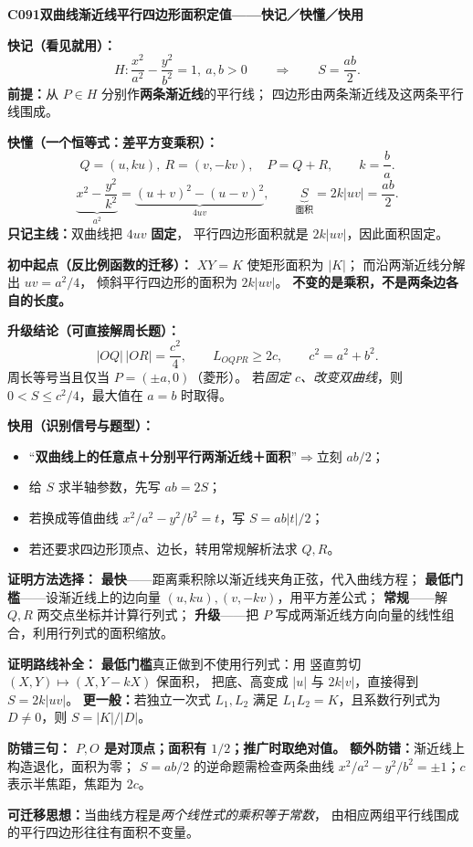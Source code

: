 \clearpage
\begin{summarybox}
\textbf{C091\quad 双曲线渐近线平行四边形面积定值——快记／快懂／快用}

\textbf{快记（看见就用）：}
\[
\boxed{H:\frac{x^2}{a^2}-\frac{y^2}{b^2}=1,\ a,b>0}
\qquad\Longrightarrow\qquad
\boxed{S=\frac{ab}{2}}.
\]
\textbf{前提：}从 $P\in H$ 分别作\textbf{两条渐近线}的平行线；
四边形由两条渐近线及这两条平行线围成。

\textbf{快懂（一个恒等式：差平方变乘积）：}
\[
Q=(u,ku),\ R=(v,-kv),\quad
P=Q+R,\qquad k=\frac ba.
\]
\[
\underbrace{x^2-\frac{y^2}{k^2}}_{a^2}
=\underbrace{(u+v)^2-(u-v)^2}_{4uv},\qquad
\underbrace{S}_{\text{面积}}=2k|uv|=\frac{ab}{2}.
\]
\textbf{只记主线：}双曲线把 $4uv$ \textbf{固定}，
平行四边形面积就是 $2k|uv|$，因此面积固定。

\textbf{初中起点（反比例函数的迁移）：}
$XY=K$ 使矩形面积为 $|K|$；
而沿两渐近线分解出 $uv=a^2/4$，
倾斜平行四边形的面积为 $2k|uv|$。
\textbf{不变的是乘积，不是两条边各自的长度。}

\textbf{升级结论（可直接解周长题）：}
\[
\boxed{|OQ|\,|OR|=\frac{c^2}{4}},\qquad
\boxed{L_{OQPR}\ge2c},\qquad c^2=a^2+b^2.
\]
周长等号当且仅当 $P=(\pm a,0)$（菱形）。
若\emph{固定 $c$、改变双曲线}，则
$\boxed{0<S\le c^2/4}$，最大值在 $a=b$ 时取得。



\textbf{快用（识别信号与题型）：}
\begin{itemize}
\item “\textbf{双曲线上的任意点＋分别平行两渐近线＋面积}”$\Rightarrow$立刻 $ab/2$；
\item 给 $S$ 求半轴参数，先写 $\boxed{ab=2S}$；
\item 若换成等值曲线 $x^2/a^2-y^2/b^2=t$，写 $\boxed{S=ab|t|/2}$；
\item 若还要求四边形顶点、边长，转用常规解析法求 $Q,R$。
\end{itemize}

\textbf{证明方法选择：}
\textbf{最快}——距离乘积除以渐近线夹角正弦，代入曲线方程；
\textbf{最低门槛}——设渐近线上的边向量 $(u,ku),(v,-kv)$，用平方差公式；
\textbf{常规}——解 $Q,R$ 两交点坐标并计算行列式；
\textbf{升级}——把 $P$ 写成两渐近线方向向量的线性组合，利用行列式的面积缩放。

\textbf{证明路线补全：}
\textbf{最低门槛}真正做到不使用行列式：用
竖直剪切 $(X,Y)\mapsto(X,Y-kX)$ 保面积，
把底、高变成 $|u|$ 与 $2k|v|$，直接得到 $S=2k|uv|$。
\textbf{更一般：}若独立一次式 $L_1,L_2$ 满足
$L_1L_2=K$，且系数行列式为 $D\ne0$，则 $S=|K|/|D|$。



\textbf{防错三句：} \textbf{$P,O$ 是对顶点；面积有 $1/2$；推广时取绝对值。}
\textbf{额外防错：}渐近线上构造退化，面积为零；
$S=ab/2$ 的逆命题需检查两条曲线
$x^2/a^2-y^2/b^2=\pm1$；$c$ 表示半焦距，焦距为 $2c$。


\textbf{可迁移思想：}当曲线方程是\emph{两个线性式的乘积等于常数}，
由相应两组平行线围成的平行四边形往往有面积不变量。
\end{summarybox}
